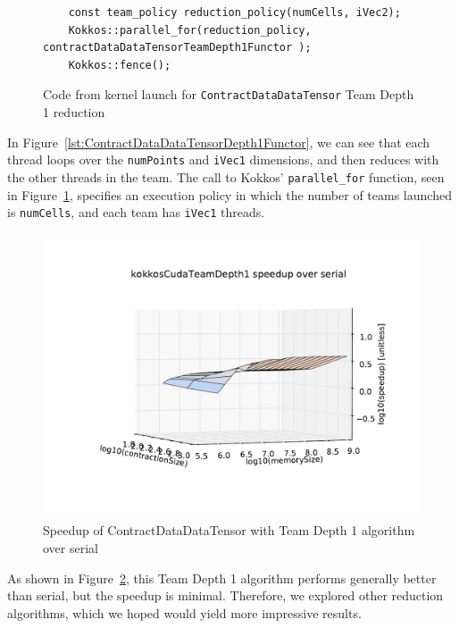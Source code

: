 \begin{figure}[ht]
    \begin{lstlisting}
    const team_policy reduction_policy(numCells, iVec2);
    Kokkos::parallel_for(reduction_policy, contractDataDataTensorTeamDepth1Functor );
    Kokkos::fence();
 \end{lstlisting}
\caption{Code from kernel launch for \texttt{ContractDataDataTensor} Team Depth
1 reduction
\label{lst:ContractDataDataTensorDepth1Call}} 
\end{figure}

In Figure~\ref{lst:ContractDataDataTensorDepth1Functor}, we can see that each
thread loops over the \texttt{numPoints} and \texttt{iVec1} dimensions, and then
reduces with the other threads in the team.  The call to Kokkos'
\texttt{parallel\_for} function, seen in
Figure~\ref{lst:ContractDataDataTensorDepth1Call}, specifies an execution policy
in which the number of teams launched is \texttt{numCells}, and each team has
\texttt{iVec1} threads.

\begin{figure}[ht]
    \includegraphics[scale=.55]{./VersusSerial_kokkosCudaTeamDepth1_clearCache_shadowfax.pdf}
\caption{Speedup of ContractDataDataTensor with Team Depth 1 algorithm over
    serial
\label{fig:ContractDataDataTensorDepth1}} 
\end{figure}

As shown in Figure~\ref{fig:ContractDataDataTensorDepth1}, this Team Depth 1
algorithm performs generally better than serial, but the speedup is minimal.
Therefore, we explored other reduction algorithms, which we hoped would yield
more impressive results.


